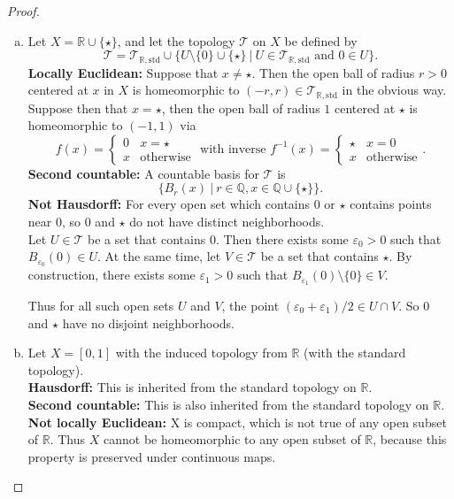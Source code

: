 \documentclass{article}
\begin{document}
\begin{proof} \text{} \\
  \begin{enumerate}[a)]
    \item Let $X = \mathbb{R} \cup \{\star\}$,
    and let the topology $\mathcal{T}$ on $X$ be defined by \[
      \mathcal{T}
        = \mathcal{T}_{\mathbb{R},\text{std}} \cup
        \{ U \setminus \{0\} \cup \{ \star \}\ |
          \ U \in \mathcal{T}_{\mathbb{R},\text{std}} \text{ and } 0\in U
        \}.
    \]
    \textbf{Locally Euclidean:} Suppose that $x \not= \star$.
    Then the open ball of radius $r > 0$ centered at $x$ in $X$ is homeomorphic to
    $(-r, r) \in \mathcal{T}_{\mathbb{R},\text{std}}$ in the obvious way.\\
    Suppose then that $x = \star$,
    then the open ball of radius $1$ centered at $\star$ is homeomorphic to $(-1, 1)$ via \[
      f(x) = \begin{cases}
        0 & x = \star \\
        x & \text{otherwise}
      \end{cases} \text{ with inverse }
      f^{-1}(x) = \begin{cases}
        \star & x = 0 \\
        x & \text{otherwise}
      \end{cases}.
    \]
    \textbf{Second countable:} A countable basis for $\mathcal{T}$ is \[
      \{B_r(x)\ |\ r \in \mathbb{Q}, x \in \mathbb{Q} \cup \{\star\}\}.
    \]
    \textbf{Not Hausdorff:} For every open set which contains $0$ or $\star$
    contains points near $0$, so $0$ and $\star$
    do not have distinct neighborhoods. \\
    Let $U \in \mathcal{T}$ be a set that contains $0$.
    Then there exists some $\varepsilon_0 > 0$
    such that $B_{\varepsilon_0}(0) \in U$.
    At the same time, let $V \in \mathcal{T}$ be a set that contains $\star$.
    By construction, there exists some $\varepsilon_1 > 0$
    such that $B_{\varepsilon_1}(0) \setminus \{ 0\} \in V$.

    Thus for all such open sets $U$ and $V$, the point
    $(\varepsilon_0 + \varepsilon_1)/2 \in U \cap V$.
    So $0$ and $\star$ have no disjoint neighborhoods.

    \item
      Let $X = [0, 1]$
      with the induced topology from $\mathbb{R}$ (with the standard topology).\\
      \textbf{Hausdorff:} This is inherited from the standard topology on $\mathbb{R}$.\\
      \textbf{Second countable:} This is also inherited from the standard topology on $\mathbb{R}$.\\
      \textbf{Not locally Euclidean:}
        X is compact, which is not true of any open subset of $\mathbb{R}$.
        Thus $X$ cannot be homeomorphic to any open subset of $\mathbb{R}$,
        because this property is preserved under continuous maps.
  \end{enumerate}
\end{proof}
\end{document}
